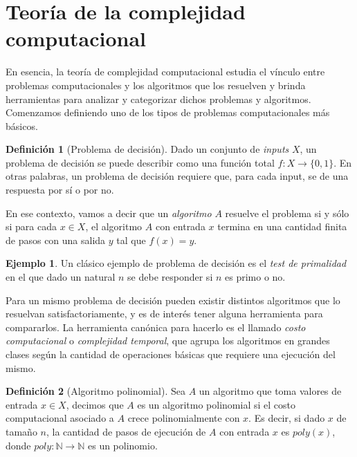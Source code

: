 \documentclass{article}
\theoremstyle{definition}
\newtheorem{definition}{Definici\'on}%
\newtheorem{example}{Ejemplo}%
\begin{document}
\section{Teor\'ia de la complejidad computacional}
\label{sec:computation}

En esencia, la teor\'ia de complejidad computacional estudia el v\'inculo entre problemas computacionales y los algoritmos que los resuelven y brinda herramientas para analizar y categorizar dichos problemas y algoritmos. Comenzamos definiendo uno de los tipos de problemas computacionales m\'as b\'asicos.

\begin{definition}[Problema de decisi\'on]
\label{def:decision}
Dado un conjunto de \emph{inputs} $X$, un problema de decisi\'on se puede describir como una funci\'on total $f : X \to \{0, 1\}$. En otras palabras, un problema de decisi\'on requiere que, para cada input, se de una respuesta por s\'i o por no.

En ese contexto, vamos a decir que un \emph{algoritmo} $A$ resuelve el problema si y s\'olo si para cada $x \in X$, el algoritmo $A$ con entrada $x$ termina en una cantidad finita de pasos con una salida $y$ tal que $f(x) = y$.
\end{definition}

\begin{example}
    Un cl\'asico ejemplo de problema de decisi\'on es el \emph{test de primalidad} en el que dado un natural $n$ se debe responder si $n$ es primo o no.
\end{example}

Para un mismo problema de decisi\'on pueden existir distintos algoritmos que lo resuelvan satisfactoriamente, y es de inter\'es tener alguna herramienta para compararlos. La herramienta can\'onica para hacerlo es el llamado \emph{costo computacional} o \emph{complejidad temporal}, que agrupa los algoritmos en grandes clases seg\'un la cantidad de operaciones b\'asicas que requiere una ejecuci\'on del mismo.

\begin{definition}[Algoritmo polinomial]
    \label{def:algopoly}
    Sea $A$ un algoritmo que toma valores de entrada $x \in X$, decimos que $A$ es un algoritmo polinomial si el costo computacional asociado a $A$ crece polinomialmente con $x$. Es decir, si dado $x$ de tama\~no $n$, la cantidad de pasos de ejecuci\'on de $A$ con entrada $x$ es $\mathit{poly}(x)$, donde $\mathit{poly} : \mathbb{N} \to \mathbb{N}$ es un polinomio.
\end{definition}
\end{document}
